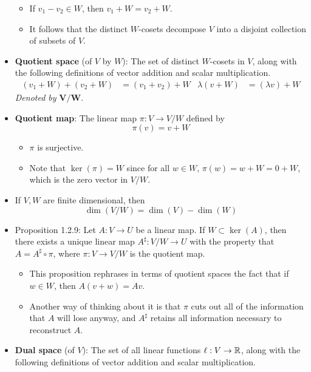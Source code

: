 \documentclass[../notes.tex]{subfiles}
\begin{document}
\begin{itemize}
\begin{itemize}
        \item If $v_1-v_2\in W$, then $v_1+W=v_2+W$.
        \item It follows that the distinct $W$-cosets decompose $V$ into a disjoint collection of subsets of $V$.
    \end{itemize}
    \item \textbf{Quotient space} (of $V$ by $W$): The set of distinct $W$-cosets in $V$, along with the following definitions of vector addition and scalar multiplication.
    \begin{align*}
        (v_1+W)+(v_2+W) &= (v_1+v_2)+W&
        \lambda(v+W) &= (\lambda v)+W
    \end{align*}
    \emph{Denoted by} $\bm{V/W}$.
    \item \textbf{Quotient map}: The linear map $\pi:V\to V/W$ defined by
    \begin{equation*}
        \pi(v) = v+W
    \end{equation*}
    \begin{itemize}
        \item $\pi$ is surjective.
        \item Note that $\ker(\pi)=W$ since for all $w\in W$, $\pi(w)=w+W=0+W$, which is the zero vector in $V/W$.
    \end{itemize}
    \item If $V,W$ are finite dimensional, then
    \begin{equation*}
        \dim(V/W) = \dim(V)-\dim(W)
    \end{equation*}
    \item Proposition 1.2.9: Let $A:V\to U$ be a linear map. If $W\subset\ker(A)$, then there exists a unique linear map $A^\sharp:V/W\to U$ with the property that $A=A^\sharp\circ\pi$, where $\pi:V\to V/W$ is the quotient map.
    \begin{itemize}
        \item This proposition rephrases in terms of quotient spaces the fact that if $w\in W$, then $A(v+w)=Av$.
        \item Another way of thinking about it is that $\pi$ cuts out all of the information that $A$ will lose anyway, and $A^\sharp$ retains all information necessary to reconstruct $A$.
    \end{itemize}
    \item \textbf{Dual space} (of $V$): The set of all linear functions $\ell:V\to\mathbb{R}$, along with the following definitions of vector addition and scalar multiplication.
    \begin{align*}

\end{align*}
\end{itemize}
\end{document}
